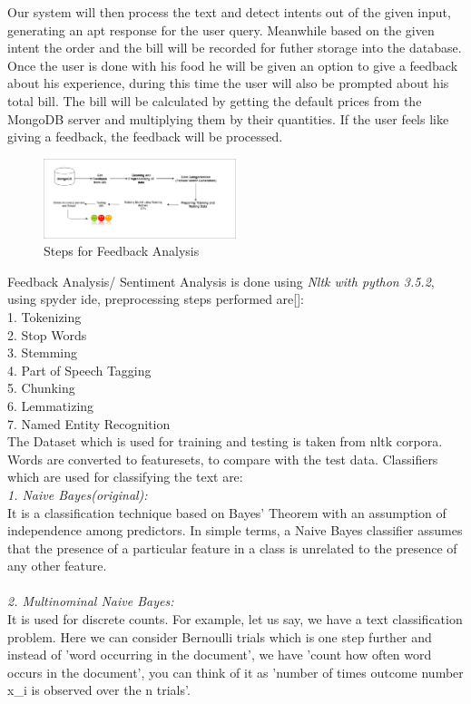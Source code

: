 \documentclass[conference]{IEEEtran}
\begin{document}
Our system will then process the text and detect intents out of the given input, generating an apt response for the user query. Meanwhile based on the given intent the order and the bill will be recorded for futher storage into the database. Once the user is done with his food he will be given an option to give a feedback about his experience, during this time the user will also be prompted about his total bill. The bill will be calculated by getting the default prices from the MongoDB server and multiplying them by their quantities. If the user feels like giving a feedback, the feedback will be processed. 
\begin{figure}[h!]
	\centering
	\includegraphics[width=0.5\textwidth]{SA.png}
	\caption{Steps for Feedback Analysis}
\end{figure}
Feedback Analysis/ Sentiment Analysis is done using \textit{Nltk with python 3.5.2}, using spyder ide, preprocessing steps performed are[\cite{b7}]:\\
1. Tokenizing\\
2. Stop Words\\
3. Stemming\\
4. Part of Speech Tagging\\
5. Chunking\\
6. Lemmatizing\\
7. Named Entity Recognition\\
The Dataset which is used for training and testing is taken from nltk corpora. Words are converted to featuresets, to compare with the test data. Classifiers which are used for classifying the text are:\\
\textit{1. Naive Bayes(original):} \\
It is a classification technique based on Bayes’ Theorem with an assumption of independence among predictors. In simple terms, a Naive Bayes classifier assumes that the presence of a particular feature in a class is unrelated to the presence of any other feature.\\\\
\textit{2. Multinominal Naive Bayes:}\\ 
It is used for discrete counts. For example, let us say,  we have a text classification problem. Here we can consider Bernoulli trials which is one step further and instead of 'word occurring in the document', we have 'count how often word occurs in the document', you can think of it as 'number of times outcome number x\_i is observed over the n trials'.\\\\
\end{document}
